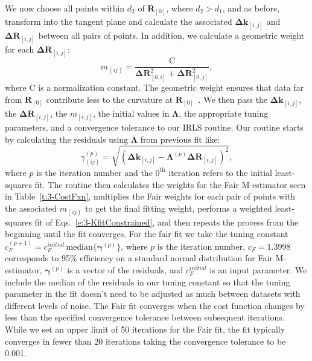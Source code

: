 We now choose all points within $d_2$ of $\mathbf{R}_{[0]}$, where $d_2 > d_1$, and as before, transform into the tangent plane and calculate the associated $\mathbf{\Delta k}_{[i,j]}$ and $\mathbf{\Delta R}_{[i,j]}$ between all pairs of points.
In addition, we calculate a geometric weight for each $\mathbf{\Delta R}_{[i,j]}$:
\begin{equation}
  m_{(ij)} = \frac{\textrm{C}} {\mathbf{\Delta R}_{[0,i]}^2 + \mathbf{\Delta R}_{[0,j]}^2},
\end{equation}
where $\textrm{C}$ is a normalization constant.
The geometric weight ensures that data far from $\mathbf{R}_{[0]}$ contribute less to the curvature at $\mathbf{R}_{[0]}$~\cite{RN32,RN31}.
We then pass the $\mathbf{\Delta k}_{[i,j]}$, the $\mathbf{\Delta R}_{[i,j]}$, the $m_{[i,j]}$, the initial values in $\bm{\Lambda}$, the appropriate tuning parameters, and a convergence tolerance to our IRLS routine.
Our routine starts by calculating the residuals using $\bm{\Lambda}$ from previous fit like:
\begin{equation}
  \gamma_{(ij)}^{(p)} = \sqrt{(\mathbf{\Delta k}_{[i,j]}- \mathbf{\Lambda}^{(p)} \mathbf{\Delta R}_{[i,j]})^2},
\end{equation}
where $p$ is the iteration number and the $0^{\textrm{th}}$ iteration refers to the initial least-squares fit.
The routine then calculates the weights for the Fair M-estimator seen in Table~\ref{t:3-CostFxn}, multiplies the Fair weights for each pair of points with the associated $m_{(ij)}$ to get the final fitting weight, performs a weighted least-squares fit of Eqs.~\ref{e:3-KfitConstrained}, and then repeats the process from the beginning until the fit converges.
For the fair fit we take the tuning constant $c_F^{(p+1)} = c_F^{initial} \, \textrm{median}\{ \bm{\gamma}^{(p)} \}$, where $p$ is the iteration number, $c_F = 1.3998$ corresponds to 95\% efficiency on a standard normal distribution for Fair M-estimator, $\bm{\gamma}^{(p)}$ is a vector of the residuals, and $c_F^{initial}$ is an input parameter.
We include the median of the residuals in our tuning constant so that the tuning parameter in the fit doesn't need to be adjusted as much between datasets with different levels of noise.
The Fair fit converges when the cost function changes by less than the specified convergence tolerance between subsequent iterations.
While we set an upper limit of 50 iterations for the Fair fit, the fit typically converges in fewer than 20 iterations taking the convergence tolerance to be 0.001.

